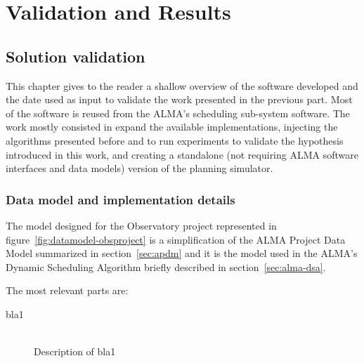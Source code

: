 \part{Validation and Results}

\chapter{Solution validation}

This chapter gives to the reader a shallow overview of the software developed and the date used as input to validate the work presented in the previous part. Most of the software is reused from the ALMA's scheduling sub-system software. The work mostly consisted in expand the available implementations, injecting the algorithms presented before and to run experiments to validate the hypothesis introduced in this work, and creating a standalone (not requiring ALMA software interfaces and data models) version of the planning simulator. 

\section {Data model and implementation details}

The model designed for the Observatory project represented in figure~\ref{fig:datamodel-obsproject} is a simplification of the ALMA Project Data Model summarized in section~\ref{sec:apdm} and it is the model used in the ALMA's Dynamic Scheduling Algorithm briefly described in section~\ref{sec:alma-dsa}.

The most relevant parts are: 
\begin{description}
\item[bla1] \hfill \\
Description of bla1
\end{description}

